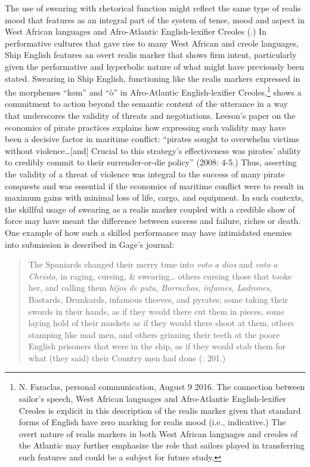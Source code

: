 The use of swearing with rhetorical function might reflect the same type of realis mood that features as an integral part of the system of tense, mood and aspect in West African languages and Afro-Atlantic English-lexifier Creoles (\citealt{FaraclasEtAl2016}.) In performative cultures that gave rise to many West African and creole languages, Ship English features an overt realis marker that shows firm intent, particularly given the performative and hyperbolic nature of what might have previously been stated. Swearing in Ship English, functioning like the realis markers expressed in the morphemes “kom” and “ò” in Afro-Atlantic English-lexifier Creoles,\footnote{N. Faraclas, personal communication, August 9 2016. The connection between sailor’s speech, West African languages and Afro-Atlantic English-lexifier Creoles is explicit in this description of the realis marker given that standard forms of English have zero marking for realis mood (i.e., indicative.) The overt nature of realis markers in both West African languages and creoles of the Atlantic may further emphasize the role that sailors played in transferring such features and could be a subject for future study.} shows a commitment to action beyond the semantic content of the utterance in a way that underscores the validity of threats and negotiations. Leeson’s paper on the economics of pirate practices explains how expressing such validity may have been a decisive factor in maritime conflict: “pirates sought to overwhelm victims without violence…[and] Crucial to this strategy’s effectiveness was pirates’ ability to credibly commit to their surrender-or-die policy” (2008: 4-5.) Thus, asserting the validity of a threat of violence was integral to the success of many pirate conquests and was essential if the economics of maritime conflict were to result in maximum gains with minimal loss of life, cargo, and equipment. In such contexts, the skillful usage of swearing as a realis marker coupled with a credible show of force may have meant the difference between success and failure, riches or death. One example of how such a skilled performance may have intimidated enemies into submission is described in Gage’s journal:

\begin{quotation}
The Spaniards changed their merry tune into \textit{voto} \textit{a} \textit{dios} and \textit{voto} \textit{a} \textit{Christo}, in raging, cursing, \& swearing… others cursing those that tooke her, and calling them \textit{hijos} \textit{de} \textit{puta,} \textit{Borrachos,} \textit{infames,} \textit{Ladrones}, Bastards, Drunkards, infamous theeves, and pyrates; some taking their swords in their hands, as if they would there cut them in pieces, some laying hold of their muskets as if they would there shoot at them, others stamping like mad men, and others grinning their teeth at the poore English prisoners that were in the ship, as if they would stab them for what (they said) their Country men had done (\citealt{Gage1648}: 201.)\end{quotation}

